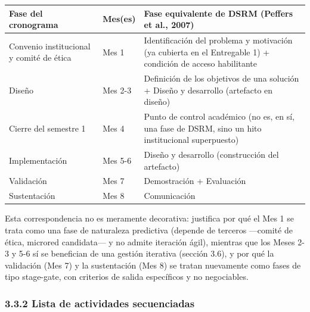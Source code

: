 \documentclass[11pt,a4paper]{article}
\begin{document}
{\small
\begin{longtable}[]{@{}
  >{\raggedright\arraybackslash}p{}
  >{\raggedright\arraybackslash}p{}
  >{\raggedright\arraybackslash}p{}@{}}
\toprule\noalign{}
\begin{minipage}[b]{\linewidth}\raggedright
Fase del cronograma
\end{minipage} & \begin{minipage}[b]{\linewidth}\raggedright
Mes(es)
\end{minipage} & \begin{minipage}[b]{\linewidth}\raggedright
Fase equivalente de DSRM (Peffers et al., 2007)
\end{minipage} \\
\midrule\noalign{}
\endhead
\bottomrule\noalign{}
\endlastfoot
Convenio institucional y comité de ética & Mes 1 & Identificación del problema y motivación (ya cubierta en el Entregable 1) + condición de acceso habilitante \\
Diseño & Mes 2-3 & Definición de los objetivos de una solución + Diseño y desarrollo (artefacto en diseño) \\
Cierre del semestre 1 & Mes 4 & Punto de control académico (no es, en sí, una fase de DSRM, sino un hito institucional superpuesto) \\
Implementación & Mes 5-6 & Diseño y desarrollo (construcción del artefacto) \\
Validación & Mes 7 & Demostración + Evaluación \\
Sustentación & Mes 8 & Comunicación \\
\end{longtable}
}

Esta correspondencia no es meramente decorativa: justifica por qué el Mes 1 se trata como una fase de naturaleza predictiva (depende de terceros ---comité de ética, microred candidata--- y no admite iteración ágil), mientras que los Meses 2-3 y 5-6 sí se benefician de una gestión iterativa (sección 3.6), y por qué la validación (Mes 7) y la sustentación (Mes 8) se tratan nuevamente como fases de tipo stage-gate, con criterios de salida específicos y no negociables.

\subsubsection{3.3.2 Lista de actividades secuenciadas}\label{lista-de-actividades-secuenciadas}
\end{document}
